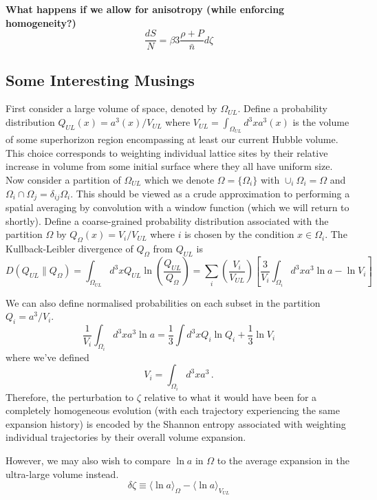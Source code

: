 \documentclass[11pt,a4paper]{article}
\begin{document}
{\bf What happens if we allow for anisotropy (while enforcing homogeneity?)}
\begin{equation}
  \frac{dS}{N} = \beta3\frac{\rho + P}{\bar{n}} d\zeta
\end{equation}

\subsection{Some Interesting Musings}
First consider a large volume of space, denoted by $\Omega_{UL}$.
Define a probability distribution $Q_{UL}(x) = a^3(x) / V_{UL}$ where $V_{UL} = \int_{\Omega_{UL}}d^3x a^3(x)$ is the volume of some superhorizon region encompassing at least our current Hubble volume.
This choice corresponds to weighting individual lattice sites by their relative increase in volume from some initial surface where they all have uniform size.
Now consider a partition of $\Omega_{UL}$ which we denote $\Omega = \{\Omega_i\}$ with $\cup_i \Omega_i = \Omega$ and $\Omega_i \cap \Omega_j = \delta_{ij}\Omega_i$.
This should be viewed as a crude approximation to performing a spatial averaging by convolution with a window function (which we will return to shortly).
Define a coarse-grained probability distribution associated with the partition $\Omega$ by $Q_\Omega(x) = V_i / V_{UL}$ where $i$ is chosen by the condition $x \in \Omega_i$.
The Kullback-Leibler divergence of $Q_\Omega$ from $Q_{UL}$ is
\begin{equation}
  D(Q_{UL} \parallel Q_\Omega) = \int_{\Omega_{UL}} d^3x Q_{UL}\ln\left(\frac{Q_{UL}}{Q_\Omega}\right) = \sum_i \left(\frac{V_i}{V_{UL}}\right)\left[\frac{3}{V_i}\int_{\Omega_i}d^3xa^3\ln a -\ln V_i\right]
\end{equation}

We can also define normalised probabilities on each subset in the partition $Q_i = a^3 / V_i$.
\begin{equation}
  \frac{1}{V_i}\int_{\Omega_i} d^3x a^3\ln a = \frac{1}{3} \int d^3x Q_i\ln Q_i + \frac{1}{3}\ln V_i
\end{equation}
where we've defined
\begin{equation}
  V_i = \int_{\Omega_i} d^3x a^3 \, .
\end{equation}
Therefore, the perturbation to $\zeta$ relative to what it would have been for a completely homogeneous evolution (with each trajectory experiencing the same expansion history) is encoded by the Shannon entropy associated with weighting individual trajectories by their overall volume expansion.

However, we may also wish to compare $\ln a$ in $\Omega$ to the average expansion in the ultra-large volume instead.
\begin{equation}
  \delta\zeta \equiv \langle \ln a \rangle_\Omega - \langle \ln a \rangle_{V_{UL}}
\end{equation}
\end{document}
